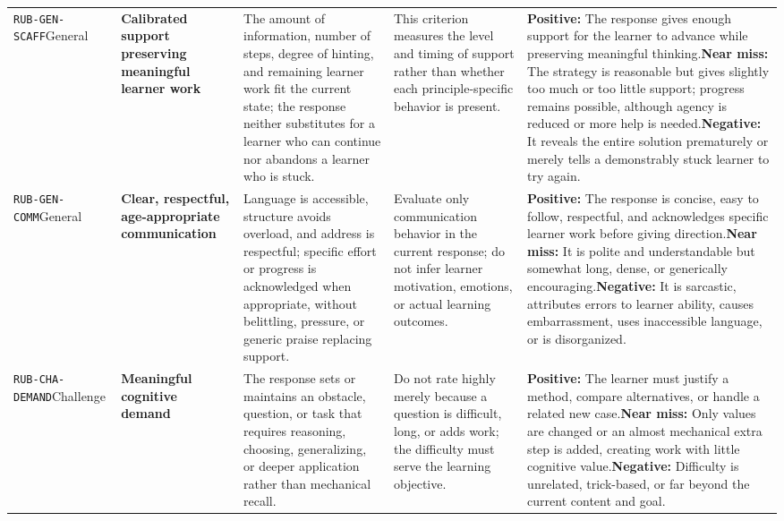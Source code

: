 \documentclass[conference]{IEEEtran}
\begin{document}
\begin{longtable}{P{0.14\textwidth}P{0.17\textwidth}P{0.20\textwidth}P{0.17\textwidth}P{0.24\textwidth}}
\texttt{RUB-GEN-SCAFF}\newline{}General & \textbf{Calibrated support preserving meaningful learner work} & The amount of information, number of steps, degree of hinting, and remaining learner work fit the current state; the response neither substitutes for a learner who can continue nor abandons a learner who is stuck. & This criterion measures the level and timing of support rather than whether each principle-specific behavior is present. & \textbf{Positive:} The response gives enough support for the learner to advance while preserving meaningful thinking.\newline\textbf{Near miss:} The strategy is reasonable but gives slightly too much or too little support; progress remains possible, although agency is reduced or more help is needed.\newline\textbf{Negative:} It reveals the entire solution prematurely or merely tells a demonstrably stuck learner to try again. \\
\texttt{RUB-GEN-COMM}\newline{}General & \textbf{Clear, respectful, age-appropriate communication} & Language is accessible, structure avoids overload, and address is respectful; specific effort or progress is acknowledged when appropriate, without belittling, pressure, or generic praise replacing support. & Evaluate only communication behavior in the current response; do not infer learner motivation, emotions, or actual learning outcomes. & \textbf{Positive:} The response is concise, easy to follow, respectful, and acknowledges specific learner work before giving direction.\newline\textbf{Near miss:} It is polite and understandable but somewhat long, dense, or generically encouraging.\newline\textbf{Negative:} It is sarcastic, attributes errors to learner ability, causes embarrassment, uses inaccessible language, or is disorganized. \\
\texttt{RUB-CHA-DEMAND}\newline{}Challenge & \textbf{Meaningful cognitive demand} & The response sets or maintains an obstacle, question, or task that requires reasoning, choosing, generalizing, or deeper application rather than mechanical recall. & Do not rate highly merely because a question is difficult, long, or adds work; the difficulty must serve the learning objective. & \textbf{Positive:} The learner must justify a method, compare alternatives, or handle a related new case.\newline\textbf{Near miss:} Only values are changed or an almost mechanical extra step is added, creating work with little cognitive value.\newline\textbf{Negative:} Difficulty is unrelated, trick-based, or far beyond the current content and goal. \\

\end{longtable}
\end{document}

